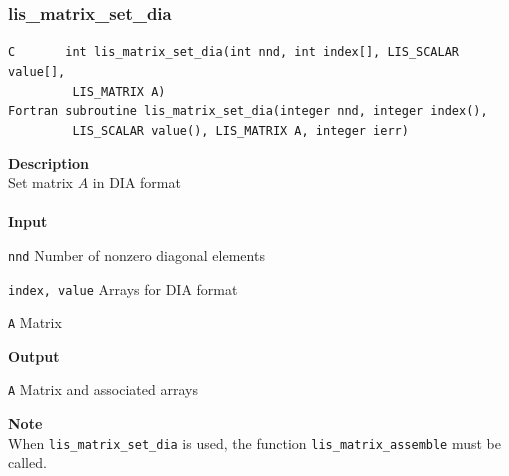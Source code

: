 \documentclass[a4paper]{article}
\newcommand{\namelistlabel}[1]{\mbox{#1}\hfill}
\newenvironment{namelist}[1]{%
 \begin{list}{}
  {\let\makelabel\namelistlabel
  \settowidth{\labelwidth}{#1}
  \setlength{\leftmargin}{1.1\labelwidth}}
}{%
\end{list}}
\begin{document}
  \subsubsection{lis\_matrix\_set\_dia}
\begin{screen}
\verb|C       int lis_matrix_set_dia(int nnd, int index[], LIS_SCALAR value[],|\\
\verb|         LIS_MATRIX A)|\\
\verb|Fortran subroutine lis_matrix_set_dia(integer nnd, integer index(), |\\
\verb|         LIS_SCALAR value(), LIS_MATRIX A, integer ierr)|
\end{screen}
{\bf Description}\\
\indent
Set matrix $A$ in DIA format
\\ \\
\noindent
{\bf Input}
\begin{namelist}{XXXXXXXXXXXXXXXXXXXX}
\item[\tt nnd] Number of nonzero diagonal elements
\item[\tt index, value] Arrays for DIA format
\item[\tt A] Matrix
\end{namelist}
{\bf Output}
\begin{namelist}{XXXXXXXXXXXXXXXXXXXX}
\item[\tt A] Matrix and associated arrays 
\end{namelist}
\noindent
{\bf Note}\\
\indent
When \verb|lis_matrix_set_dia| is used, 
the function \verb|lis_matrix_assemble| must be called. 

\newpage
\end{document}
